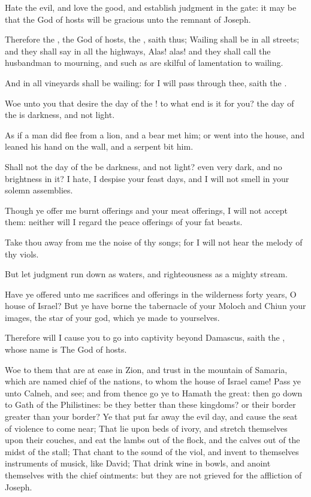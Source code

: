 \Verse Hate the evil, and love the good, and establish judgment in the gate: it may be that the \LORD God of hosts will be gracious unto the remnant of Joseph.

\Verse Therefore the \LORD, the God of hosts, the \LORD, saith thus; Wailing shall be in all streets; and they shall say in all the highways, Alas! alas!  and they shall call the husbandman to mourning, and such as are skilful of lamentation to wailing.

\Verse And in all vineyards shall be wailing: for I will pass through thee, saith the \LORD.

\Verse Woe unto you that desire the day of the \LORD! to what end is it for you? the day of the \LORD is darkness, and not light.

\Verse As if a man did flee from a lion, and a bear met him; or went into the house, and leaned his hand on the wall, and a serpent bit him.

\Verse Shall not the day of the \LORD be darkness, and not light? even very dark, and no brightness in it?  \Verse I hate, I despise your feast days, and I will not smell in your solemn assemblies.

\Verse Though ye offer me burnt offerings and your meat offerings, I will not accept them: neither will I regard the peace offerings of your fat beasts.

\Verse Take thou away from me the noise of thy songs; for I will not hear the melody of thy viols.

\Verse But let judgment run down as waters, and righteousness as a mighty stream.

\Verse Have ye offered unto me sacrifices and offerings in the wilderness forty years, O house of Israel?  \Verse But ye have borne the tabernacle of your Moloch and Chiun your images, the star of your god, which ye made to yourselves.

\Verse Therefore will I cause you to go into captivity beyond Damascus, saith the \LORD, whose name is The God of hosts.


\Chapter
\Verse Woe to them that are at ease in Zion, and trust in the mountain of Samaria, which are named chief of the nations, to whom the house of Israel came!  \Verse Pass ye unto Calneh, and see; and from thence go ye to Hamath the great: then go down to Gath of the Philistines: be they better than these kingdoms? or their border greater than your border?  \Verse Ye that put far away the evil day, and cause the seat of violence to come near; \Verse That lie upon beds of ivory, and stretch themselves upon their couches, and eat the lambs out of the flock, and the calves out of the midst of the stall; \Verse That chant to the sound of the viol, and invent to themselves instruments of musick, like David; \Verse That drink wine in bowls, and anoint themselves with the chief ointments: but they are not grieved for the affliction of Joseph.


